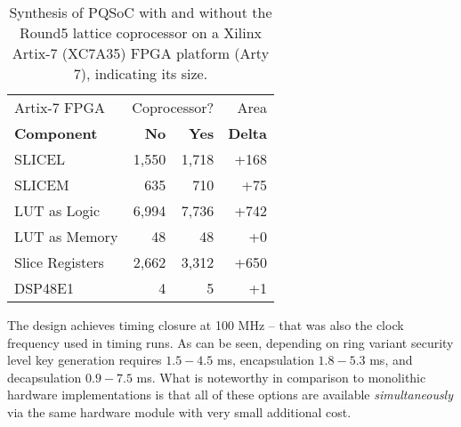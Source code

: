 \documentclass[a4paper]{article}
\begin{document}
\begin{table}
\begin{center}

    \begin{tabular}{| l | r r r |}
    \hline
    Artix-7 FPGA    & \multicolumn{2}{r}{Coprocessor?} & Area \\
    {\bf Component} & {\bf No } & {\bf Yes} & {\bf Delta} \\
    \hline
    SLICEL          & 1,550     & 1,718     & +168  \\
    SLICEM          &   635     &   710     & +75   \\
    LUT as Logic    & 6,994     & 7,736     & +742  \\
    LUT as Memory   &    48     &    48     & +0    \\
    Slice Registers & 2,662     & 3,312     & +650  \\
    DSP48E1         &     4     &    5      & +1    \\
    \hline
\end{tabular}

    \caption{Synthesis of PQSoC with and without the Round5 lattice
    coprocessor on a Xilinx Artix-7 (XC7A35) FPGA platform (Arty 7),
    indicating its size.}
    \label{tab:fpgasize}
\end{center}
\end{table}

The design achieves timing closure at 100 MHz -- that was also the clock
frequency used in timing runs. As can be seen, depending on ring variant
security level key generation requires $1.5 - 4.5$ ms,
encapsulation $1.8 - 5.3$ ms, and decapsulation
$0.9 - 7.5$ ms. What is noteworthy in comparison to monolithic
hardware implementations is that all of these options are available
\emph{simultaneously} via the same hardware module with very small additional
cost.
\end{document}
